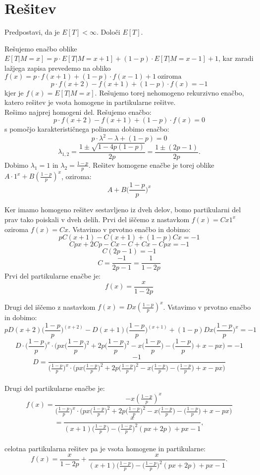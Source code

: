 \documentclass[12pt, a4paper]{article}
\begin{document}
\section[Rešitev]{Rešitev}
Predpostavi, da je $E[T] < \infty$. Določi $E[T]$.
\bigskip

Rešujemo enačbo oblike $E[T|M=x] = p\cdot E[T|M=x+1] + (1-p)\cdot E[T|M=x-1] + 1$, kar zaradi lažjega zapisa prevedemo na obliko $f(x) = p\cdot f(x+1) + (1-p) \cdot f(x-1) + 1 ~ \textrm{oziroma} $ $$p\cdot f(x+2) - f(x+1) + (1-p)\cdot f(x) = -1$$ kjer je $f(x)=E[T|M=x]$. Rešujemo torej nehomogeno rekurzivno enačbo, katero rešitev je vsota homogene in partikularne rešitve. 
\\
Rešimo najprej homogeni del. Rešujemo enačbo: $$p\cdot f(x+2) - f(x+1) + (1-p)\cdot f(x) = 0$$ s pomočjo karakterističnega polinoma dobimo enačbo: $$p\cdot  \lambda ^2 - \lambda + (1-p) = 0$$ $$\lambda _{1, 2}= \frac{1 \pm \sqrt{1 - 4p(1-p)}}{2p} = \frac{1 \pm (2p-1)}{2p}.$$
Dobimo $\lambda _{1} = 1$ in $\lambda _{2} = \frac{1-p}{p}$. Rešitev homogene enačbe je torej oblike $A\cdot 1^x + B(\frac{1-p}{p})^x$, oziroma: $$A+ B \bigg( \frac{1-p}{p} \bigg )^x$$

Ker imamo homogeno rešitev sestavljeno iz dveh delov, bomo partikularni del prav tako poiskali v dveh delih. Prvi del iščemo z nastavkom $f(x)= Cx1^x$ oziroma $f(x)= Cx$. Vstavimo v prvotno enačbo in dobimo: $$pC(x+1)-C(x+1)+(1-p)Cx=-1$$ $$Cpx+2Cp-Cx-C+Cx-Cpx=-1$$ $$C(2p-1)=-1$$ $$C=\frac{-1}{2p-1} = \frac{1}{1-2p}$$ Prvi del partikularne enačbe je: $$f(x)=\frac{x}{1-2p}$$

Drugi del iščemo z nastavkom $f(x) = D x (\frac{1-p}{p})^x$. Vstavimo v prvotno enačbo in dobimo:
$$pD(x+2)\bigg( \frac{1-p}{p} \bigg )^{(x+2)} - D(x+1)\bigg( \frac{1-p}{p} \bigg )^{(x+1 )}+(1-p)Dx\bigg( \frac{1-p}{p} \bigg )^x = -1$$ 
$$D \cdot \bigg( \frac{1-p}{p} \bigg )^x \cdot \bigg( px\bigg( \frac{1-p}{p} \bigg )^2 + 2p\bigg( \frac{1-p}{p} \bigg )^2 -x\bigg( \frac{1-p}{p} \bigg )-\bigg( \frac{1-p}{p} \bigg )+x-px \bigg )= -1$$ 
$$D = \frac{-1}{\big( \frac{1-p}{p} \big )^x \cdot \big( px\big( \frac{1-p}{p} \big )^2 + 2p\big( \frac{1-p}{p} \big )^2 -x\big( \frac{1-p}{p} \big )-\big( \frac{1-p}{p} \big )+x-px \big )}$$ 
\\
Drugi del partikularne enačbe je: $$f(x) = \frac{-x  (\frac{1-p}{p})^x}{\big( \frac{1-p}{p} \big )^x \cdot \big( px\big( \frac{1-p}{p} \big )^2 + 2p\big( \frac{1-p}{p} \big )^2 -x\big( \frac{1-p}{p} \big )-\big( \frac{1-p}{p} \big )+x-px \big )}$$ $$= \frac{x}{(x+1)\big( \frac{1-p}{p} \big )-\big( \frac{1-p}{p} \big )^2(px+2p)+px-1},$$\\
celotna partikularna rešitev pa je vsota homogene in partikularne: $$f(x)=\frac{x}{1-2p}+\frac{x}{(x+1)\big( \frac{1-p}{p} \big )-\big( \frac{1-p}{p} \big )^2(px+2p)+px-1}.$$\\
\end{document}
